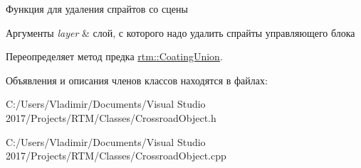 Функция для удаления спрайтов со сцены 
\begin{DoxyParams}{Аргументы}
{\em layer} & слой, с которого надо удалить спрайты управляющего блока \\
\hline
\end{DoxyParams}


Переопределяет метод предка \hyperlink{classrtm_1_1_coating_union_a4e046aae25ce91da0408ac31a0de4e21}{rtm\+::\+Coating\+Union}.



Объявления и описания членов классов находятся в файлах\+:\begin{DoxyCompactItemize}
\item 
C\+:/\+Users/\+Vladimir/\+Documents/\+Visual Studio 2017/\+Projects/\+R\+T\+M/\+Classes/Crossroad\+Object.\+h\item 
C\+:/\+Users/\+Vladimir/\+Documents/\+Visual Studio 2017/\+Projects/\+R\+T\+M/\+Classes/Crossroad\+Object.\+cpp\end{DoxyCompactItemize}
